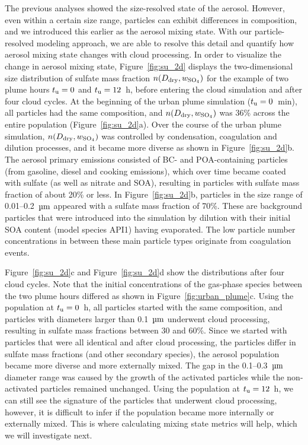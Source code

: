 \documentclass[edeposit,fullpage]{uiucthesis2009}
\begin{document}
The previous analyses showed the size-resolved state of the
aerosol. However, even within a certain size range, particles can
exhibit differences in composition, and we introduced this earlier as
the aerosol mixing state. With our particle-resolved modeling approach,
we are able to resolve this detail and quantify how aerosol mixing
state changes with cloud processing. In order to visualize the change
in aerosol mixing state, Figure~\ref{fig:su_2d} displays the
two-dimensional size distribution of sulfate mass fraction $n(D_{\rm
  dry}, w_{\rm SO_4})$ for the example of two plume hours $t_{\rm u} =
0$ and $t_{\rm u} = 12$~h, before entering the cloud simulation and
after four cloud cycles. At the beginning of the urban plume
simulation ($t_{\rm u} = 0$~min), all particles had the same
composition, and $n(D_{\rm dry}, w_{\rm SO_4})$ was 36\% across the
entire population (Figure~\ref{fig:su_2d}a). Over the course of the
urban plume simulation, $n(D_{\rm dry}, w_{\rm SO_4})$ was controlled
by condensation, coagulation and dilution processes, and it became
more diverse as shown in Figure~\ref{fig:su_2d}b. The aerosol primary
emissions consisted of BC- and POA-containing particles (from
gasoline, diesel and cooking emissions), which over time became coated
with sulfate (as well as nitrate and SOA), resulting in particles with
sulfate mass fraction of about 20\% or less.  In
Figure~\ref{fig:su_2d}b, particles in the size range of 0.01--0.2~$\rm
\mu m$ appeared with a sulfate mass fraction of 70\%. These are
background particles that were introduced into the simulation by
dilution with their initial SOA content (model species API1) having
evaporated. The low particle number concentrations in between these
main particle types originate from coagulation events.

Figure~\ref{fig:su_2d}c and Figure~\ref{fig:su_2d}d show the
distributions after four cloud cycles. Note that the initial
concentrations of the gas-phase species between the two plume hours
differed as shown in Figure~\ref{fig:urban_plume}c. Using the
population at $t_{\rm u} = 0$~h, all particles started with the same
composition, and particles with diameters larger than 0.1~$\rm \mu m$
underwent cloud processing, resulting in sulfate mass fractions
between 30 and 60\%. Since we started with particles that were all
identical and after cloud processing, the particles differ in sulfate
mass fractions (and other secondary species), the aerosol population
became more diverse and more externally mixed. The gap in the
  0.1--0.3~$\rm \mu m$ diameter range was caused by the growth of the
  activated particles while the non-activated particles remained
  unchanged. Using the population at $t_{\rm u} = 12$~h, we can still
see the signature of the particles that underwent cloud processing,
however, it is difficult to infer if the population became more
internally or externally mixed. This is where calculating mixing state
metrics will help, which we will investigate next.
\end{document}
